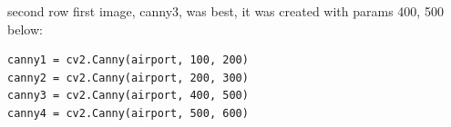 \documentclass{article}
\begin{document}
 \quad
{} \par

second row first image, canny3, was best, it was created with params 400, 500 below:
\begin{verbatim} 
canny1 = cv2.Canny(airport, 100, 200)
canny2 = cv2.Canny(airport, 200, 300)
canny3 = cv2.Canny(airport, 400, 500)
canny4 = cv2.Canny(airport, 500, 600)
\end{verbatim}
\end{document}
